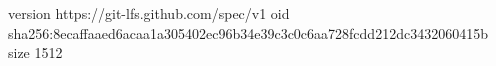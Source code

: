 version https://git-lfs.github.com/spec/v1
oid sha256:8ecaffaaed6acaa1a305402ec96b34e39c3c0c6aa728fcdd212dc3432060415b
size 1512
